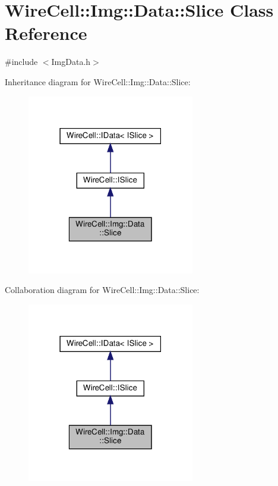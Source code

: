 \hypertarget{class_wire_cell_1_1_img_1_1_data_1_1_slice}{}\section{Wire\+Cell\+:\+:Img\+:\+:Data\+:\+:Slice Class Reference}
\label{class_wire_cell_1_1_img_1_1_data_1_1_slice}


{\ttfamily \#include $<$Img\+Data.\+h$>$}



Inheritance diagram for Wire\+Cell\+:\+:Img\+:\+:Data\+:\+:Slice\+:
\nopagebreak
\begin{figure}[H]
\begin{center}
\leavevmode
\includegraphics[width=207pt]{class_wire_cell_1_1_img_1_1_data_1_1_slice__inherit__graph}
\end{center}
\end{figure}


Collaboration diagram for Wire\+Cell\+:\+:Img\+:\+:Data\+:\+:Slice\+:
\nopagebreak
\begin{figure}[H]
\begin{center}
\leavevmode
\includegraphics[width=207pt]{class_wire_cell_1_1_img_1_1_data_1_1_slice__coll__graph}
\end{center}
\end{figure}
